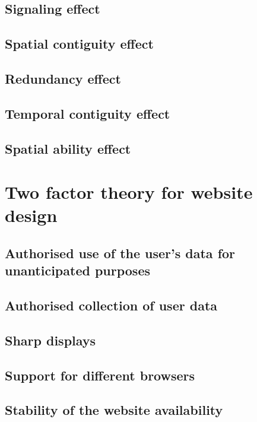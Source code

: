         \subsection{Signaling effect}

        \subsection{Spatial contiguity effect}

        \subsection{Redundancy effect}

        \subsection{Temporal contiguity effect}

        \subsection{Spatial ability effect}

    \section{Two factor theory for website design}

        \subsection{Authorised use of the user's data for unanticipated purposes}

        \subsection{Authorised collection of user data}

        \subsection{Sharp displays}

        \subsection{Support for different browsers}

        \subsection{Stability of the website availability}

